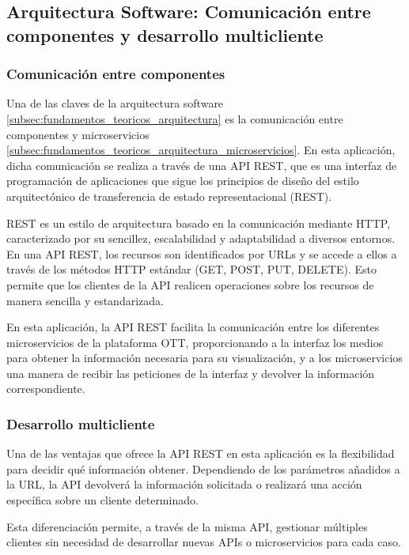 \subsection{Arquitectura Software: Comunicación entre componentes y desarrollo multicliente}
\label{subsec:arquitectura_software}

\subsubsection{Comunicación entre componentes}
\label{subsec:arquitectura_software_comunicacion}

Una de las claves de la arquitectura software \ref{subsec:fundamentos_teoricos_arquitectura} es la comunicación 
entre componentes y microservicios \ref{subsec:fundamentos_teoricos_arquitectura_microservicios}. En esta 
aplicación, dicha comunicación se realiza a través de una API REST, que es una interfaz de programación de 
aplicaciones que sigue los principios de diseño del estilo arquitectónico de transferencia de estado 
representacional (REST).

REST es un estilo de arquitectura basado en la comunicación mediante HTTP, caracterizado por su sencillez, 
escalabilidad y adaptabilidad a diversos entornos. En una API REST, los recursos son identificados por URLs 
y se accede a ellos a través de los métodos HTTP estándar (GET, POST, PUT, DELETE). Esto permite que los 
clientes de la API realicen operaciones sobre los recursos de manera sencilla y estandarizada.

En esta aplicación, la API REST facilita la comunicación entre los diferentes microservicios de la 
plataforma OTT, proporcionando a la interfaz los medios para obtener la información necesaria para 
su visualización, y a los microservicios una manera de recibir las peticiones de la interfaz y 
devolver la información correspondiente.

\subsubsection{Desarrollo multicliente}
\label{subsec:arquitectura_software_multicliente}

Una de las ventajas que ofrece la API REST en esta aplicación es la flexibilidad para decidir qué 
información obtener. Dependiendo de los parámetros añadidos a la URL, la API devolverá la información 
solicitada o realizará una acción específica sobre un cliente determinado.

Esta diferenciación permite, a través de la misma API, gestionar múltiples clientes sin necesidad de 
desarrollar nuevas APIs o microservicios para cada caso.
